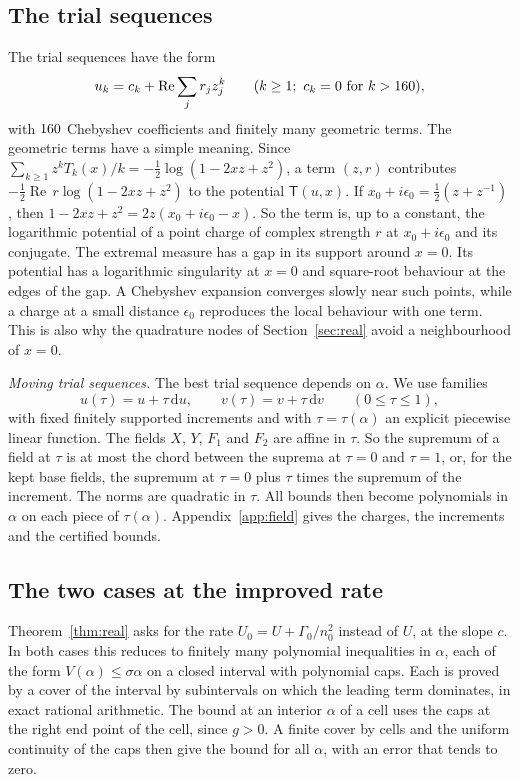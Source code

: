 \subsection{The trial sequences}\label{ssec:trials}
The trial sequences have the form
\begin{equation}\label{eq:trial}
 u_k=c_k+\operatorname{Re}\sum_jr_jz_j^k\qquad(k\ge1;\ c_k=0\text{ for }k>160),
\end{equation}
with $160$ Chebyshev coefficients and finitely many geometric terms. The geometric terms have a simple
meaning. Since $\sum_{k\ge1}z^kT_k(x)/k=-\frac12\log(1-2xz+z^2)$, a term $(z,r)$ contributes
$-\frac12\operatorname{Re}\,r\log(1-2xz+z^2)$ to the potential $\mathsf T(u,x)$. If
$x_0+i\epsilon_0=\frac12(z+z^{-1})$, then $1-2xz+z^2=2z(x_0+i\epsilon_0-x)$. So the term is, up to a constant,
the logarithmic potential of a point charge of complex strength $r$ at $x_0+i\epsilon_0$ and its conjugate. The
extremal measure has a gap in its support around $x=0$. Its potential has a logarithmic singularity at $x=0$
and square-root behaviour at the edges of the gap. A Chebyshev expansion converges slowly near such points,
while a charge at a small distance $\epsilon_0$ reproduces the local behaviour with one term. This is also why
the quadrature nodes of Section~\ref{sec:real} avoid a neighbourhood of $x=0$.

\emph{Moving trial sequences.} The best trial sequence depends on $\alpha$. We use families
\[
 u(\tau)=u+\tau\,\mathrm du,\qquad v(\tau)=v+\tau\,\mathrm dv\qquad(0\le\tau\le1),
\]
with fixed finitely supported increments and with $\tau=\tau(\alpha)$ an explicit piecewise linear function. The fields
$X$, $Y$, $F_1$ and $F_2$ are affine in $\tau$. So the supremum of a field at $\tau$ is at most the chord between the
suprema at $\tau=0$ and $\tau=1$, or, for the kept base fields, the supremum at $\tau=0$ plus $\tau$ times the supremum of the
increment. The norms are quadratic in $\tau$. All bounds then become polynomials in $\alpha$ on each piece of
$\tau(\alpha)$. Appendix~\ref{app:field} gives the charges, the increments and the certified bounds.

\subsection{The two cases at the improved rate}\label{ssec:cases}
Theorem~\ref{thm:real} asks for the rate $U_0=U+\Gamma_0/n_0^2$ instead of $U$, at the slope $c$. In both cases this
reduces to finitely many polynomial inequalities in $\alpha$, each of the form $V(\alpha)\le\sigma\alpha$ on a closed
interval with polynomial caps. Each is proved by a cover of the interval by subintervals on which the leading
term dominates, in exact rational arithmetic. The bound at an interior $\alpha$ of a cell uses the caps at the right
end point of the cell, since $g>0$. A finite cover by cells and the uniform continuity of the caps then give the
bound for all $\alpha$, with an error that tends to zero.

